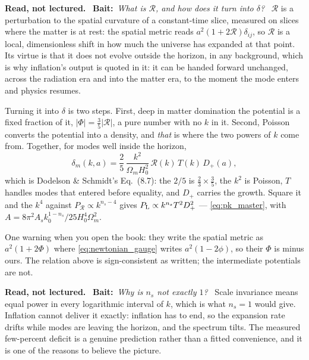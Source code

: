 \documentclass[a4paper,11pt]{article}
\def\Plin{P_{\rm L}}
\def\Om{\Omega_m}
\numberwithin{equation}{section}
\newenvironment{reading}
  {\par\medskip\noindent\begingroup\small\color{black!58}%
   \textbf{Read, not lectured.}\ }
  {\endgroup\par\medskip}
\newcommand{\bait}[1]{\textbf{Bait:}\ \emph{#1}\ }
\begin{document}
\begin{reading}
\bait{What \emph{is} $\mathcal{R}$, and how does it turn into $\delta$?}
$\mathcal{R}$ is a perturbation to the spatial curvature of a constant-time
slice, measured on slices where the matter is at rest: the spatial metric reads
$a^2(1+2\mathcal{R})\delta_{ij}$, so $\mathcal{R}$ is a local, dimensionless
shift in how much the universe has expanded at that point. Its virtue is that it
does not evolve outside the horizon, in any background, which is why inflation's
output is quoted in it: it can be handed forward unchanged, across the radiation
era and into the matter era, to the moment the mode enters and physics resumes.

Turning it into $\delta$ is two steps. First, deep in matter domination the
potential is a fixed fraction of it, $|\Phi| = \tfrac35|\mathcal{R}|$, a pure number with no $k$ in it. Second, Poisson converts the potential into a density,
and \emph{that} is where the two powers of $k$ come from. Together, for modes
well inside the horizon,
\begin{equation*}
\delta_m(k,a) = \frac{2}{5}\,\frac{k^2}{\Om H_0^2}\,\mathcal{R}(k)\,T(k)\,D_+(a) ,
\end{equation*}
which is Dodelson \& Schmidt's Eq.~(8.7): the $2/5$ is $\tfrac23\times\tfrac35$,
the $k^2$ is Poisson, $T$ handles modes that entered before equality, and $D_+$
carries the growth. Square it and the $k^4$ against $P_{\mathcal{R}} \propto
k^{n_s-4}$ gives $\Plin \propto k^{n_s}T^2D_+^2$ --- \eqref{eq:pk_master}, with
$A = 8\pi^2A_s k_0^{1-n_s}/25H_0^4\Om^2$.

One warning when you open the book: they write the spatial metric as
$a^2(1+2\Phi)$ where \eqref{eq:newtonian_gauge} writes $a^2(1-2\phi)$, so their
$\Phi$ is minus ours. The relation above is sign-consistent as written; the
intermediate potentials are not.
\end{reading}

\begin{reading}
\bait{Why is $n_s$ not exactly $1$?}
Scale invariance means equal power in every logarithmic interval of $k$, which is
what $n_s = 1$ would give. Inflation cannot deliver it exactly: inflation has to
end, so the expansion rate drifts while modes are leaving the horizon, and the
spectrum tilts. The measured few-percent deficit is a genuine prediction rather
than a fitted convenience, and it is one of the reasons to believe the picture.
\end{reading}
\end{document}
